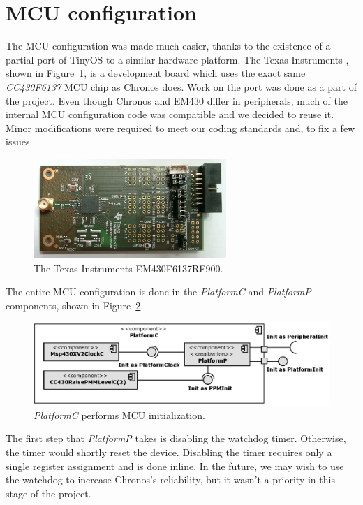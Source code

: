 \section{MCU configuration}

The MCU configuration was made much easier, thanks to the existence of a partial port of TinyOS to a similar hardware platform. The Texas Instruments \cite{EM430}, shown in Figure~\ref{fig:em430_board}, is a development board which uses the exact same \emph{CC430F6137} MCU chip as Chronos does. Work on the port was done as a part of the \cite{OSIAN} project. Even though Chronos and EM430 differ in peripherals, much of the internal MCU configuration code was compatible and we decided to reuse it.  Minor modifications were required to meet our coding standards and, to fix a few issues.
\begin{figure}[h]
  \centering
  \includegraphics[width=0.65\textwidth]{img/em430_board.jpg}
  \caption{The Texas Instruments EM430F6137RF900.}
  \label{fig:em430_board}
\end{figure}

The entire MCU configuration is done in the \emph{PlatformC} and \emph{PlatformP} components, shown in Figure~\ref{fig:platformc}.
\begin{figure}[h]
  \centering
  \includegraphics[width=1.0\textwidth]{diagrams/platformc.eps}
  \caption{\emph{PlatformC} performs MCU initialization.}
  \label{fig:platformc}
\end{figure}
The first step that \emph{PlatformP} takes is disabling the watchdog timer. Otherwise, the timer would shortly reset the device. Disabling the timer requires only a single register assignment and is done inline. In the future, we may wish to use the watchdog to increase Chronos's reliability, but it wasn't a priority in this stage of the project.

